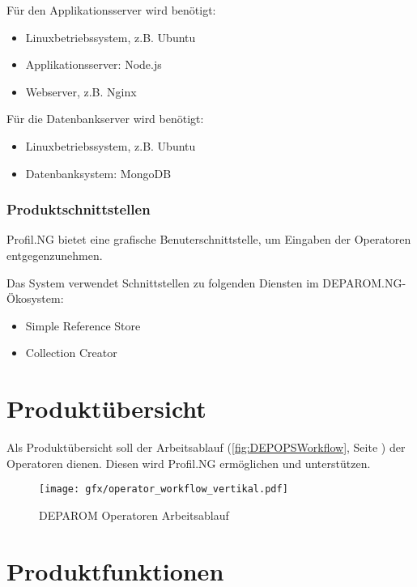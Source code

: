 Für den Applikationsserver wird benötigt:

\begin{itemize}
  \item{Linuxbetriebssystem, z.B. Ubuntu}
  \item{Applikationsserver: Node.js}
  \item{Webserver, z.B. Nginx}
\end{itemize}

Für die Datenbankserver wird benötigt:

\begin{itemize}
  \item{Linuxbetriebssystem, z.B. Ubuntu}
  \item{Datenbanksystem: MongoDB}
\end{itemize}

\subsubsection{Produktschnittstellen}

Profil.NG bietet eine grafische Benuterschnittstelle, um Eingaben der Operatoren
entgegenzunehmen.

Das System verwendet Schnittstellen zu folgenden Diensten im DEPAROM.NG-Ökosystem:

\begin{itemize}
  \item{Simple Reference Store}
  \item{Collection Creator}
\end{itemize}

\section{Produktübersicht}

Als Produktübersicht soll der Arbeitsablauf (\autoref{fig:DEPOPSWorkflow},
Seite \pageref{fig:DEPOPSWorkflow}) der Operatoren dienen. Diesen wird Profil.NG
ermöglichen und unterstützen.

\begin{figure}[h]
  \texttt{[image: gfx/operator\_workflow\_vertikal.pdf]}
  \caption{DEPAROM Operatoren Arbeitsablauf}
  \label{fig:DEPOPSWorkflow}
\end{figure}

\section{Produktfunktionen}


